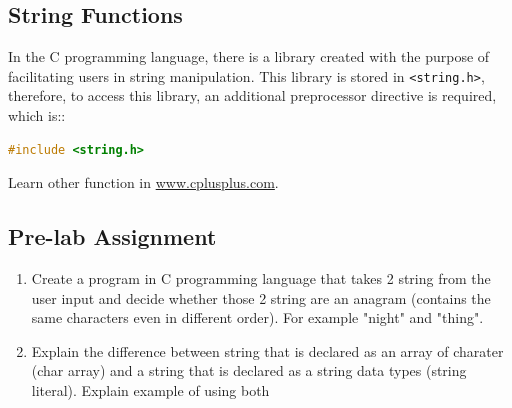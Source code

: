 \subsection{String Functions}

In the C programming language, there is a library created with the purpose of facilitating users in string manipulation. This library is stored in \verb|<string.h>|,
therefore, to access this library, an additional preprocessor directive is required, which is::
\begin{lstlisting}[language=c]
	#include <string.h>
\end{lstlisting}

Learn other function in \href{http://www.cplusplus.com/}{www.cplusplus.com}.

\subsection{Pre-lab Assignment}
\begin{enumerate}
	\item Create a program in C programming language that takes 2 string from the user input and decide whether those 2 string are an anagram (contains the same characters even in different order).
	      For example "night" and "thing".
	\item Explain the difference between string that is declared as an array of charater (char array) and a string that is declared as a string data types (string literal). Explain example of using both
\end{enumerate}